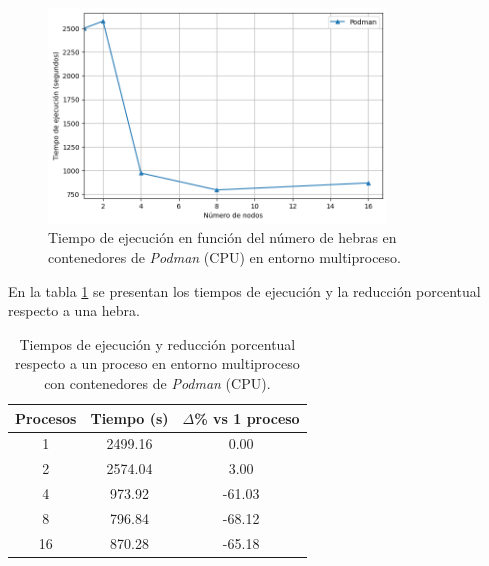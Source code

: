 \begin{figure}[H]
    \centering
    \includegraphics[width=0.8\textwidth]{imagenes/cap5/multi-node_ubuntu_podman_time.png}
    \caption{Tiempo de ejecución en función del número de hebras en contenedores de \textit{Podman} (CPU) en entorno multiproceso.}
    \label{fig:multi-node_ubuntu_podman}
\end{figure}

En la tabla \ref{tab:multi-node_ubuntu_podman} se presentan los tiempos de ejecución y la reducción porcentual respecto a una hebra.

\begin{table}[ht]
    \centering
    \begin{tabular}{|c|c|c|}
        \hline
        \textbf{Procesos} & \textbf{Tiempo (s)} & \textbf{$\Delta$\% vs 1 proceso} \\
        \hline
        1                 & 2499.16             & 0.00                             \\
        2                 & 2574.04             & 3.00                             \\
        4                 & 973.92              & -61.03                           \\
        8                 & 796.84              & -68.12                           \\
        16                & 870.28              & -65.18                           \\
        \hline
    \end{tabular}
    \caption{Tiempos de ejecución y reducción porcentual respecto a un proceso en entorno multiproceso con contenedores de \textit{Podman} (CPU).}
    \label{tab:multi-node_ubuntu_podman}
\end{table}

